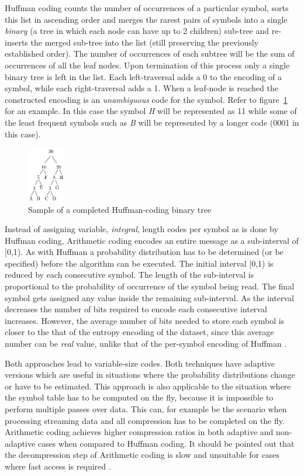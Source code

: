 Huffman coding counts the number of occurrences of a particular symbol, sorts this list in ascending order and merges the rarest pairs of symbols into a single \textit{binary} 
(a tree in which each node can have up to 2 children) sub-tree and re-inserts the merged sub-tree into the list (still preserving the previously established order). The number of occurrences 
of each subtree will be the sum of occurrences of all the leaf nodes. Upon termination of this process only a single binary tree is left in the list. Each left-traversal adds a 0 to the encoding 
of a symbol, while each right-traversal adds a 1. When a leaf-node is reached the constructed encoding is an \textit{unambiguous} code for the symbol. Refer to figure~\ref{HUFFMAN} for an example.
In this case the symbol \textit{H} will be represented as 11 while some of the least frequent symbols such as \textit{B} will be represented by a longer code (0001 in this case).
\begin{figure}[h!]
 \centering
 \includegraphics[width=0.15\textwidth]{huffmanTree.png}
 \caption{Sample of a completed Huffman-coding binary tree \cite[p. 70]{salomon2004data}}
 \label{HUFFMAN}
\end{figure}

Instead of assigning variable, \textit{integral}, length codes per symbol as is done by Huffman coding, Arithmetic coding encodes an entire message as a sub-interval of [0,1). As with
Huffman a probability distribution has to be determined (or be specified) before the algorithm can be executed. The initial interval [0,1) is reduced by each consecutive 
symbol. The length of the sub-interval is proportional to the probability of occurrence of the symbol being read. The final symbol gets assigned any value inside the remaining 
sub-interval. As the interval decreases the number of bits required to encode each consecutive interval increases. However, the average number of bits needed to store 
each symbol is closer to the that of the entropy encoding of the dataset, since this average number can be \textit{real} value, unlike that of the per-symbol encoding of Huffman \cite[ch. 2]{salomon2004data}.

Both approaches lead to variable-size codes. Both techniques have adaptive versions which are useful in situations where the probability distributions change or have to be estimated. 
This approach is also applicable to the situation where the symbol table has to be computed on the fly, because it is impossible to perform multiple passes over data. This can, for example
be the scenario when processing streaming data and all compression has to be completed on the fly. Arithmetic coding achieves higher compression ratios in both adaptive and non-adaptive cases 
when compared to Huffman coding. It should be pointed out that the decompression step of Arithmetic coding is slow and unsuitable for cases where fast access is 
required \cite{ray1995database,williams1999compressing}\cite[ch. 2]{salomon2004data}.

